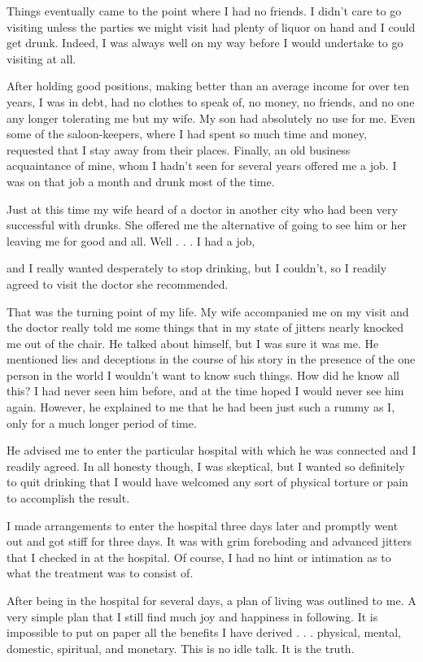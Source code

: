 \begin{biblechapter}
Things eventually came to the point where I had no friends. I didn’t care to go visiting unless the parties we might visit had plenty of liquor on hand and I could get drunk. Indeed, I was always well on my way before I would undertake to go visiting at all.

After holding good positions, making better than an average income for over ten years, I was in debt, had no clothes to speak of, no money, no friends, and no one any longer tolerating me but my wife. My son had absolutely no use for me. Even some of the saloon-keepers, where I had spent so much time and money, requested that I stay away from their places. Finally, an old business acquaintance of mine, whom I hadn’t seen for several years offered me a job. I was on that job a month and drunk most of the time.

Just at this time my wife heard of a doctor in another city who had been very successful with drunks. She offered me the alternative of going to see him or her leaving me for good and all. Well . . . I had a job,

and I really wanted desperately to stop drinking, but I couldn’t, so I readily agreed to visit the doctor she recommended.

That was the turning point of my life. My wife accompanied me on my visit and the doctor really told me some things that in my state of jitters nearly knocked me out of the chair. He talked about himself, but I was sure it was me. He mentioned lies and deceptions in the course of his story in the presence of the one person in the world I wouldn’t want to know such things. How did he know all this? I had never seen him before, and at the time hoped I would never see him again. However, he explained to me that he had been just such a rummy as I, only for a much longer period of time.

He advised me to enter the particular hospital with which he was connected and I readily agreed. In all honesty though, I was skeptical, but I wanted so definitely to quit drinking that I would have welcomed any sort of physical torture or pain to accomplish the result.

I made arrangements to enter the hospital three days later and promptly went out and got stiff for three days. It was with grim foreboding and advanced jitters that I checked in at the hospital. Of course, I had no hint or intimation as to what the treatment was to consist of.

After being in the hospital for several days, a plan of living was outlined to me. A very simple plan that I still find much joy and happiness in following. It is impossible to put on paper all the benefits I have derived . . . physical, mental, domestic, spiritual, and monetary. This is no idle talk. It is the truth.


\end{biblechapter}
